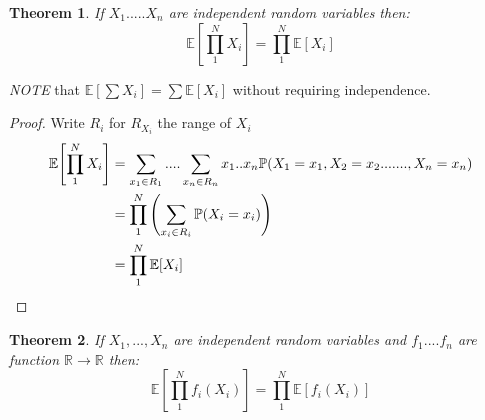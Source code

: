 \documentclass{notes}
\theoremstyle{plain}
\newtheorem{theorem}{Theorem}[chapter]
\newcommand{\bP}{\mathbb{P}}
\newcommand{\bR}{\mathbb{R}}
\newcommand{\bE}{\mathbb{E}}
\newcommand{\prob}[1]{\bP \negthinspace\left(#1\right)}
\newcommand{\expect}[1]{\bE\!\left[#1\right]}
\begin{document}
\begin{theorem}
If $X_1.....X_n$ are independent random variables then:
\[
\expect{\prod_1^N X_i} =\prod_1^N \expect{X_i}
\]
\end{theorem}
\emph{NOTE} that $\expect{\sum X_i} = \sum\expect{X_i}$ without 
requiring independence.
\begin{proof}
Write $R_i$ for $R_{X_i}$ the range of $X_i$
\begin{align*}
\expect{\prod_1^N X_i} &= \sum_{x_1 \in R_1}.... \sum_{x_n \in R_n}x_1..x_n 
\prob{X_1 = x_1, X_2 = x_2.......,X_n = x_n}\\
&= \prod_1^N \left(\sum_{x_i \in R_i} \prob{X_i = x_i}\right)\\
&= \prod_1^N \expect{X_i}
\end{align*}
\end{proof}
\begin{theorem}
If $X_1,...,X_n$ are independent random variables and $f_1....f_n$ are function
$\bR \to \bR$ then:
\[
\expect{\prod_1^N f_i(X_i)} =\prod_1^N \expect{ f_i(X_i)}
\]
\end{theorem}
\end{document}
